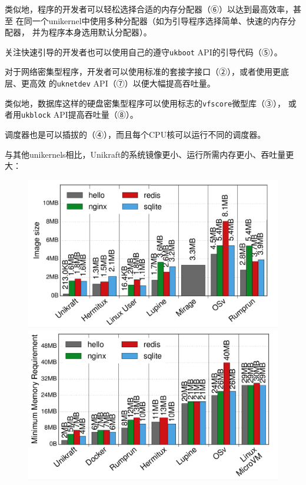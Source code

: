 \documentclass[UTF8,fontset=none,linespread=1.15]{ctexart}
\begin{document}
类似地，程序的开发者可以轻松选择合适的内存分配器（⑥）以达到最高效率，甚至
在同一个unikernel中使用多种分配器（如为引导程序选择简单、快速的内存分配器，
并为程序本身选用默认分配器）。

关注快速引导的开发者也可以使用自己的遵守\texttt{ukboot} API的引导代码（⑤）。

对于网络密集型程序，开发者可以使用标准的套接字接口（②），或者使用更底层、更高效
的\texttt{uknetdev} API（⑦）以便大幅提高吞吐量。

类似地，数据库这样的硬盘密集型程序可以使用标志的\texttt{vfscore}微型库（③），
或者用\texttt{ukblock} API提高吞吐量（⑧）。

调度器也是可以插拔的（④），而且每个CPU核可以运行不同的调度器。


与其他unikernels相比，Unikraft的系统镜像更小、运行所需内存更小、吞吐量更大：
\begin{figure}[H]
\centering
\begin{minipage}{0.32\linewidth}
\includegraphics[width=1\linewidth]{pictures/Unikraft-image-size.png}
\caption{}
\label{fig:unikraft-image-size}
\end{minipage}
\begin{minipage}{0.32\linewidth}
\includegraphics[width=1\linewidth]{pictures/Unikraft-memory.png}

\end{minipage}
\end{figure}
\end{document}

